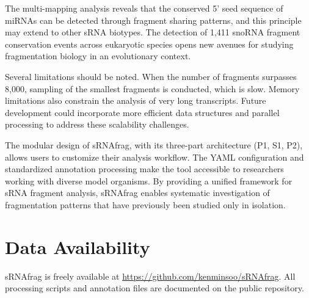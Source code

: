 \documentclass[11pt]{article}
\begin{document}
The multi-mapping analysis reveals that the conserved 5' seed sequence of miRNAs can be detected through fragment sharing patterns, and this principle may extend to other sRNA biotypes. The detection of 1,411 snoRNA fragment conservation events across eukaryotic species opens new avenues for studying fragmentation biology in an evolutionary context.

Several limitations should be noted. When the number of fragments surpasses 8,000, sampling of the smallest fragments is conducted, which is slow. Memory limitations also constrain the analysis of very long transcripts. Future development could incorporate more efficient data structures and parallel processing to address these scalability challenges.

The modular design of sRNAfrag, with its three-part architecture (P1, S1, P2), allows users to customize their analysis workflow. The YAML configuration and standardized annotation processing make the tool accessible to researchers working with diverse model organisms. By providing a unified framework for sRNA fragment analysis, sRNAfrag enables systematic investigation of fragmentation patterns that have previously been studied only in isolation.

\section*{Data Availability}

sRNAfrag is freely available at \url{https://github.com/kenminsoo/sRNAfrag}. All processing scripts and annotation files are documented on the public repository.


\end{document}
